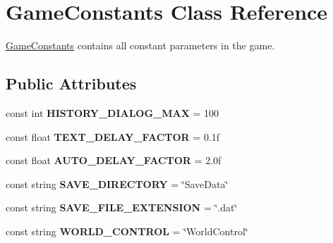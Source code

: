 \hypertarget{class_game_constants}{}\section{Game\+Constants Class Reference}
\label{class_game_constants}


\hyperlink{class_game_constants}{Game\+Constants} contains all constant parameters in the game.  


\subsection*{Public Attributes}
\begin{DoxyCompactItemize}
\item 
const int {\bfseries H\+I\+S\+T\+O\+R\+Y\+\_\+\+D\+I\+A\+L\+O\+G\+\_\+\+M\+AX} = 100\hypertarget{class_game_constants_ad4292f6c4ea9634341f6eca0f7eaf59d}{}\label{class_game_constants_ad4292f6c4ea9634341f6eca0f7eaf59d}

\item 
const float {\bfseries T\+E\+X\+T\+\_\+\+D\+E\+L\+A\+Y\+\_\+\+F\+A\+C\+T\+OR} = 0.\+1f\hypertarget{class_game_constants_ae7e9db8e38d970f420ffea1bedaad6ef}{}\label{class_game_constants_ae7e9db8e38d970f420ffea1bedaad6ef}

\item 
const float {\bfseries A\+U\+T\+O\+\_\+\+D\+E\+L\+A\+Y\+\_\+\+F\+A\+C\+T\+OR} = 2.\+0f\hypertarget{class_game_constants_ad8de66debf37ae3f1ae9f0287adb6bf1}{}\label{class_game_constants_ad8de66debf37ae3f1ae9f0287adb6bf1}

\item 
const string {\bfseries S\+A\+V\+E\+\_\+\+D\+I\+R\+E\+C\+T\+O\+RY} = \char`\"{}Save\+Data\char`\"{}\hypertarget{class_game_constants_ae43bacbc34f29f462796fbd884656876}{}\label{class_game_constants_ae43bacbc34f29f462796fbd884656876}

\item 
const string {\bfseries S\+A\+V\+E\+\_\+\+F\+I\+L\+E\+\_\+\+E\+X\+T\+E\+N\+S\+I\+ON} = \char`\"{}.dat\char`\"{}\hypertarget{class_game_constants_a13089dfa700d2378c87181569278f64a}{}\label{class_game_constants_a13089dfa700d2378c87181569278f64a}

\item 
const string {\bfseries W\+O\+R\+L\+D\+\_\+\+C\+O\+N\+T\+R\+OL} = \char`\"{}World\+Control\char`\"{}\hypertarget{class_game_constants_a23e891e72abf23d0d128a2fd5d5a3205}{}\label{class_game_constants_a23e891e72abf23d0d128a2fd5d5a3205}


\end{DoxyCompactItemize}
